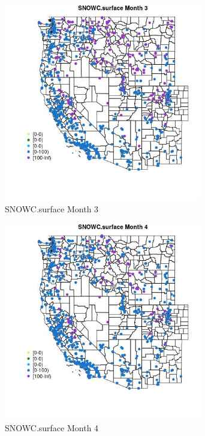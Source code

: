 \begin{figure} 
\centering  
\includegraphics[width=0.77\textwidth]{Code_Outputs/Report_ML_input_PM25_Step4_part_e_de_duplicated_aves_compiled_2019-05-21wNAs_MapObsMo3SNOWCsurface.jpg} 
\caption{\label{fig:Report_ML_input_PM25_Step4_part_e_de_duplicated_aves_compiled_2019-05-21wNAsMapObsMo3SNOWCsurface}SNOWC.surface Month 3} 
\end{figure} 
 

\begin{figure} 
\centering  
\includegraphics[width=0.77\textwidth]{Code_Outputs/Report_ML_input_PM25_Step4_part_e_de_duplicated_aves_compiled_2019-05-21wNAs_MapObsMo4SNOWCsurface.jpg} 
\caption{\label{fig:Report_ML_input_PM25_Step4_part_e_de_duplicated_aves_compiled_2019-05-21wNAsMapObsMo4SNOWCsurface}SNOWC.surface Month 4} 
\end{figure} 
 

